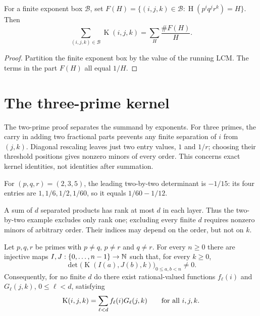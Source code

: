 \documentclass[11pt]{article}
\newcommand{\hgt}{\operatorname{H}}
\newcommand{\Kernel}{\operatorname{K}}
\begin{document}
\begin{proposition}\label{res:fibre-prop}
For a finite exponent box $\mathcal B$, set
$F(H)=\{(i,j,k)\in\mathcal B:\hgt(p^iq^jr^k)=H\}$.  Then
\begin{equation}\label{res:fibre}
 \sum_{(i,j,k)\in\mathcal B}\Kernel(i,j,k)=\sum_H\frac{\#F(H)}H.
\end{equation}
\end{proposition}
\begin{proof}
Partition the finite exponent box by the value of the running LCM. The terms
in the part $F(H)$ all equal $1/H$.
\end{proof}

\section{The three-prime kernel}\label{sec:rank}
The two-prime proof separates the summand by exponents. For three primes,
the carry in adding two fractional parts prevents any finite separation
of $i$ from $(j,k)$. Diagonal rescaling leaves just two entry values,
$1$ and $1/r$; choosing their threshold positions gives nonzero minors
of every order. This concerns exact kernel identities, not identities
after summation.


\begin{example}\label{res:rank}
For $(p,q,r)=(2,3,5)$, the leading two-by-two determinant is $-1/15$:
its four entries are $1,1/6,1/2,1/60$, so it equals $1/60-1/12$.
\end{example}

A sum of $d$ separated products has rank at most $d$ in each layer.
Thus the two-by-two example excludes only rank one; excluding every
finite $d$ requires nonzero minors of arbitrary order. Their indices
may depend on the order, but not on $k$.

\begin{theorem}\label{res:infinite-rank}
Let $p,q,r$ be primes with $p\ne q$, $p\ne r$ and $q\ne r$.  For every
$n\ge0$ there are injective maps $I,J:\{0,\ldots,n-1\}\to\mathbb{N}$ such that, for
every $k\ge0$,
\[
 \det\bigl(\Kernel(I(a),J(b),k)\bigr)_{0\le a,b<n}\ne0.
\]
Consequently, for no finite $d$ do there exist rational-valued functions
$f_\ell(i)$ and $G_\ell(j,k)$, $0\le\ell<d$, satisfying
\[
 \Kernel(i,j,k)=\sum_{\ell<d}f_\ell(i)G_\ell(j,k)
 \qquad\hbox{for all }i,j,k.
\]
\end{theorem}
\end{document}
